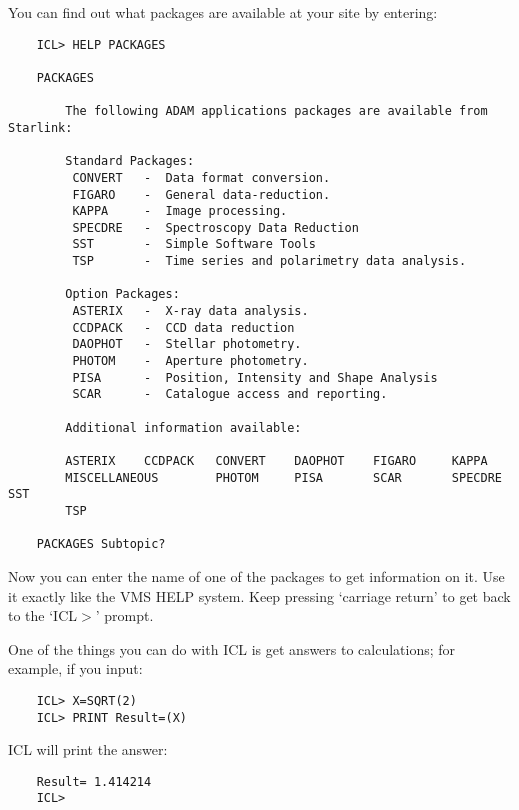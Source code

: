 You can find out what packages are available at your site by entering:

\begin{small}
\begin{verbatim}
    ICL> HELP PACKAGES

    PACKAGES

        The following ADAM applications packages are available from Starlink:

        Standard Packages:
         CONVERT   -  Data format conversion.
         FIGARO    -  General data-reduction.
         KAPPA     -  Image processing.
         SPECDRE   -  Spectroscopy Data Reduction
         SST       -  Simple Software Tools
         TSP       -  Time series and polarimetry data analysis.

        Option Packages:
         ASTERIX   -  X-ray data analysis.
         CCDPACK   -  CCD data reduction
         DAOPHOT   -  Stellar photometry.
         PHOTOM    -  Aperture photometry.
         PISA      -  Position, Intensity and Shape Analysis
         SCAR      -  Catalogue access and reporting.

        Additional information available:

        ASTERIX    CCDPACK   CONVERT    DAOPHOT    FIGARO     KAPPA
        MISCELLANEOUS        PHOTOM     PISA       SCAR       SPECDRE   SST
        TSP

    PACKAGES Subtopic?
\end{verbatim}
\end{small}

Now you can enter the name of one of the packages to get information on it.
Use it exactly like the VMS HELP system.
Keep pressing `carriage return' to get back to the `ICL$>$' prompt.

One of the things you can do with ICL is get answers to calculations; for
example, if you input:

\begin{small}
\begin{verbatim}
    ICL> X=SQRT(2)
    ICL> PRINT Result=(X)
\end{verbatim}
\end{small}

ICL will print the answer:

\begin{small}
\begin{verbatim}
    Result= 1.414214
    ICL>
\end{verbatim}
\end{small}

